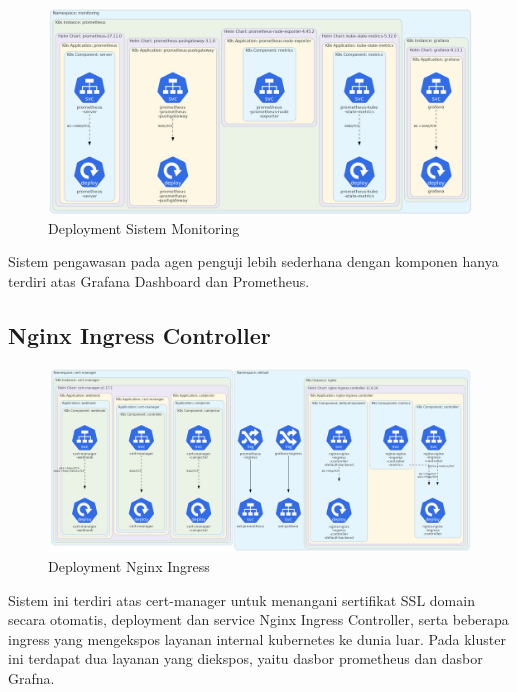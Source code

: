 \begin{figure}[htbp]
    \centering
    \includegraphics[width=1\textwidth]{resources/chapter-4/agent-monitoring.png}
    \caption{Deployment Sistem Monitoring}
    \label{fig:deployment-monitoring-agent}
\end{figure}

Sistem pengawasan pada agen penguji lebih sederhana dengan komponen hanya terdiri atas Grafana Dashboard dan Prometheus.

\pagebreak

\subsection{Nginx Ingress Controller}

\begin{figure}[htbp]
    \centering
    \includegraphics[width=1\textwidth]{resources/chapter-4/agent-nginx.png}
    \caption{Deployment Nginx Ingress}
    \label{fig:deployment-nginx-agent}
\end{figure}

Sistem ini terdiri atas cert-manager untuk menangani sertifikat SSL domain secara otomatis, deployment dan service Nginx Ingress Controller, serta beberapa ingress yang mengekspos layanan internal kubernetes ke dunia luar. Pada kluster ini terdapat dua layanan yang diekspos, yaitu dasbor prometheus dan dasbor Grafna.

